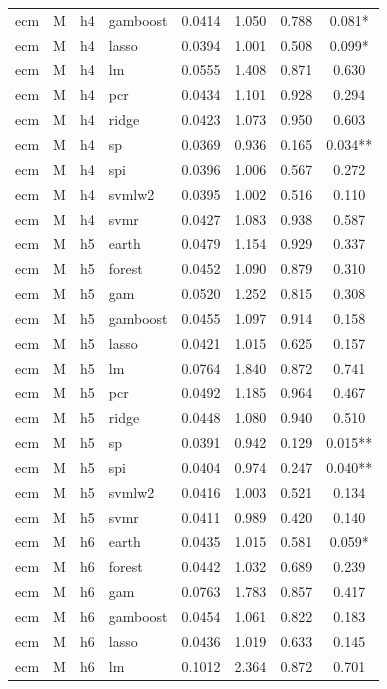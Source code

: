 \begin{ThreePartTable}
\begin{longtable}[t]{llclcccc}
ecm & M & h4 & gamboost & 0.0414 & 1.050 & 0.788 & 0.081*\\
ecm & M & h4 & lasso & 0.0394 & 1.001 & 0.508 & 0.099*\\
ecm & M & h4 & lm & 0.0555 & 1.408 & 0.871 & 0.630\\
ecm & M & h4 & pcr & 0.0434 & 1.101 & 0.928 & 0.294\\
ecm & M & h4 & ridge & 0.0423 & 1.073 & 0.950 & 0.603\\
ecm & M & h4 & sp & 0.0369 & 0.936 & 0.165 & 0.034**\\
ecm & M & h4 & spi & 0.0396 & 1.006 & 0.567 & 0.272\\
ecm & M & h4 & svmlw2 & 0.0395 & 1.002 & 0.516 & 0.110\\
ecm & M & h4 & svmr & 0.0427 & 1.083 & 0.938 & 0.587\\
\addlinespace
ecm & M & h5 & earth & 0.0479 & 1.154 & 0.929 & 0.337\\
ecm & M & h5 & forest & 0.0452 & 1.090 & 0.879 & 0.310\\
ecm & M & h5 & gam & 0.0520 & 1.252 & 0.815 & 0.308\\
ecm & M & h5 & gamboost & 0.0455 & 1.097 & 0.914 & 0.158\\
ecm & M & h5 & lasso & 0.0421 & 1.015 & 0.625 & 0.157\\
ecm & M & h5 & lm & 0.0764 & 1.840 & 0.872 & 0.741\\
ecm & M & h5 & pcr & 0.0492 & 1.185 & 0.964 & 0.467\\
ecm & M & h5 & ridge & 0.0448 & 1.080 & 0.940 & 0.510\\
ecm & M & h5 & sp & 0.0391 & 0.942 & 0.129 & 0.015**\\
ecm & M & h5 & spi & 0.0404 & 0.974 & 0.247 & 0.040**\\
ecm & M & h5 & svmlw2 & 0.0416 & 1.003 & 0.521 & 0.134\\
ecm & M & h5 & svmr & 0.0411 & 0.989 & 0.420 & 0.140\\
\addlinespace
ecm & M & h6 & earth & 0.0435 & 1.015 & 0.581 & 0.059*\\
ecm & M & h6 & forest & 0.0442 & 1.032 & 0.689 & 0.239\\
ecm & M & h6 & gam & 0.0763 & 1.783 & 0.857 & 0.417\\
ecm & M & h6 & gamboost & 0.0454 & 1.061 & 0.822 & 0.183\\
ecm & M & h6 & lasso & 0.0436 & 1.019 & 0.633 & 0.145\\
ecm & M & h6 & lm & 0.1012 & 2.364 & 0.872 & 0.701\\

\end{longtable}
\end{ThreePartTable}
